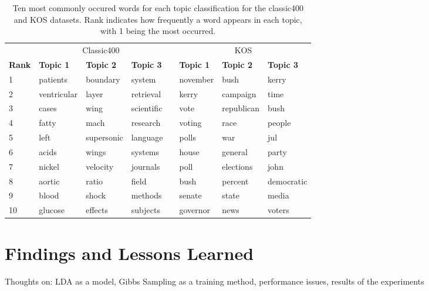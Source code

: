\documentclass[10pt]{article}
\newcommand{\ra}[1]{\renewcommand{\arraystretch}{#1}}
\begin{document}
\begin{table}[t]
	\centering
    \ra{1.2}
	\begin{tabular}{@{} l l l l c l l l @{}}
        \toprule
        & \multicolumn{3}{c}{Classic400} & \phantom{abc} & \multicolumn{3}{c}{KOS}\\
        \cmidrule{2-4} \cmidrule{6-8}
        \bf{Rank} & \bf{Topic 1} & \bf{Topic 2} & \bf{Topic 3} && \bf{Topic 1} & \bf{Topic 2} & \bf{Topic 3} \\
        \midrule
         1 & patients    & boundary   & system     && november & bush       & kerry \\
         2 & ventricular & layer      & retrieval  && kerry    & campaign   & time \\
         3 & cases       & wing       & scientific && vote     & republican & bush \\
         4 & fatty       & mach       & research   && voting   & race       & people \\
         5 & left        & supersonic & language   && polls    & war        & jul \\
         6 & acids       & wings      & systems    && house    & general    & party \\
         7 & nickel      & velocity   & journals   && poll     & elections  & john \\
         8 & aortic      & ratio      & field      && bush     & percent    & democratic \\
         9 & blood       & shock      & methods    && senate   & state      & media \\
        10 & glucose     & effects    & subjects   && governor & news       & voters \\
        \bottomrule
	\end{tabular}
	\caption{Ten most commonly occured words for each topic classification for the classic400 and KOS datasets. Rank indicates how frequently a word appears in each topic, with 1 being the most occurred.}
	\label{tab:most_common}
\end{table}



\section{Findings and Lessons Learned}
\label{sec:conclusion}

Thoughts on: LDA as a model, Gibbs Sampling as a training method, performance issues, results of the experiments




\end{document}
